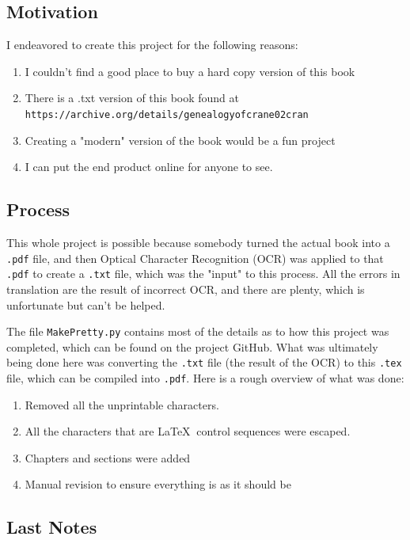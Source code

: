 \documentclass[oneside]{book}
\begin{document}
\subsection{Motivation}

I endeavored to create this project for the following reasons: 

\begin{enumerate}
\item I couldn't find a good place to buy a hard copy version of this book
\item There is a .txt version of this book found at \texttt{https://archive.org/details/genealogyofcrane02cran}
\item Creating a "modern" version of the book would be a fun project
\item I can put the end product online for anyone to see. 
\end{enumerate}

\subsection{Process}

This whole project is possible because somebody turned the actual book into a \texttt{.pdf} file, and then Optical Character Recognition (OCR) was applied to that \texttt{.pdf} to create a \texttt{.txt} file, which was the "input" to this process. All the errors in translation are the result of incorrect OCR, and there are plenty, which is unfortunate but can't be helped. 

The file \texttt{MakePretty.py} contains most of the details as to how this project was completed, which can be found on the project GitHub. What was ultimately being done here was converting the \texttt{.txt} file (the result of the OCR) to this \texttt{.tex} file, which can be compiled into \texttt{.pdf}.  Here is a rough overview of what was done: 

\begin{enumerate}
\item Removed all the unprintable characters. 
\item All the characters that are \LaTeX $\:$ control sequences were escaped.
\item Chapters and sections were added 
\item Manual revision to ensure everything is as it should be 
\end{enumerate}

\subsection{Last Notes}
\end{document}
